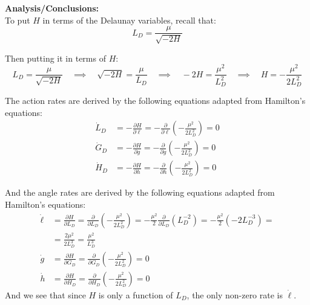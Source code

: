 \documentclass[titlepage]{article}
\begin{document}
\textbf{Analysis/Conclusions:}\\

To put $H$ in terms of the Delaunay variables, recall that:
\begin{equation}
	L_D=\frac{\mu}{\sqrt{-2H}}
\end{equation}

Then putting it in terms of $H$:
\begin{equation}
	L_D=\frac{\mu}{\sqrt{-2H}}\quad\implies\quad \sqrt{-2H}=\frac{\mu}{L_D}\quad\implies\quad -2H=\frac{\mu^2}{L_D^2}\quad\implies\quad H=-\frac{\mu^2}{2L_D^2}
\end{equation}

\begin{mdframed}[linewidth=1pt, innertopmargin=10pt, innerbottommargin=10pt]
	The action rates are derived by the following equations adapted from Hamilton's equations:
	\begin{equation}
		\begin{split}
			\dot{L}_D&=-\frac{\partial H}{\partial\ell}=-\frac{\partial}{\partial\ell}\left(-\frac{\mu^2}{2L_D^2}\right)=0 \\
			\dot{G}_D&=-\frac{\partial H}{\partial g}=-\frac{\partial}{\partial g}\left(-\frac{\mu^2}{2L_D^2}\right)=0 \\
			\dot{H}_D&=-\frac{\partial H}{\partial h}=-\frac{\partial}{\partial h}\left(-\frac{\mu^2}{2L_D^2}\right)=0
		\end{split}
	\end{equation}
	
	And the angle rates are derived by the following equations adapted from Hamilton's equations:
	\begin{equation}
		\begin{split}
			\dot{\ell}&=\frac{\partial H}{\partial L_D}=\frac{\partial}{\partial L_D}\left(-\frac{\mu^2}{2L_D^2}\right)=-\frac{\mu^2}{2}\frac{\partial}{\partial L_D}\left(L_D^{-2}\right)=-\frac{\mu^2}{2}\left(-2L_D^{-3}\right)= \\
			&=\frac{2\mu^2}{2L_D^3}=\frac{\mu^2}{L_D^3} \\
			\dot{g}&=\frac{\partial H}{\partial G_D}=\frac{\partial}{\partial G_D}\left(-\frac{\mu^2}{2L_D^2}\right)=0 \\
			\dot{h}&=\frac{\partial H}{\partial H_D}=\frac{\partial}{\partial H_D}\left(-\frac{\mu^2}{2L_D^2}\right)=0
		\end{split}
	\end{equation}
	And we see that since $H$ is only a function of $L_D$, the only non-zero rate is $\dot{\ell}$.
\end{mdframed}
\end{document}
